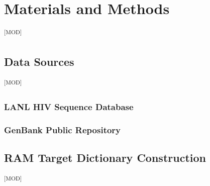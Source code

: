 \documentclass[12pt]{article}
\newcommand{\GradeModerate}{\textsuperscript{\textsf{[MOD]}}}
\begin{document}
\section{Materials and Methods}\label{sec:methods}\GradeModerate

\subsection{Data Sources}\label{sec:data_sources}\GradeModerate

\subsubsection{LANL HIV Sequence Database}\label{sec:lanl}


\subsubsection{GenBank Public Repository}\label{sec:genbank}


\subsection{RAM Target Dictionary Construction}\label{sec:ram_dict}\GradeModerate


\end{document}
